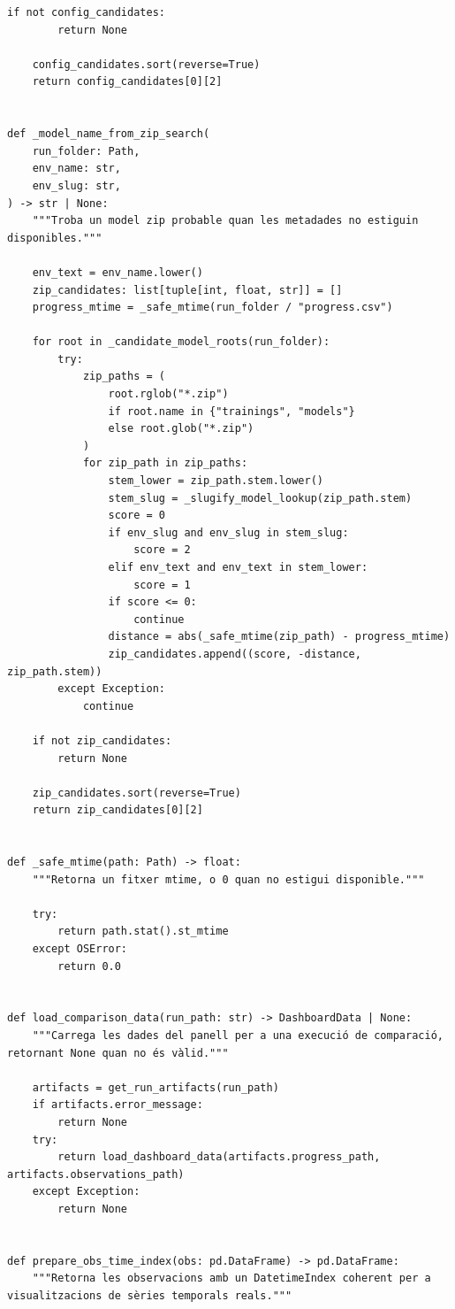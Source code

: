 \documentclass[10pt,a4paper]{article}
\begin{document}
\begin{lstlisting}[style=studioPython,caption={backend/resultats\_backend.py},label={lst:backend-resultats-backend-py}]
    if not config_candidates:
        return None

    config_candidates.sort(reverse=True)
    return config_candidates[0][2]


def _model_name_from_zip_search(
    run_folder: Path,
    env_name: str,
    env_slug: str,
) -> str | None:
    """Troba un model zip probable quan les metadades no estiguin disponibles."""

    env_text = env_name.lower()
    zip_candidates: list[tuple[int, float, str]] = []
    progress_mtime = _safe_mtime(run_folder / "progress.csv")

    for root in _candidate_model_roots(run_folder):
        try:
            zip_paths = (
                root.rglob("*.zip")
                if root.name in {"trainings", "models"}
                else root.glob("*.zip")
            )
            for zip_path in zip_paths:
                stem_lower = zip_path.stem.lower()
                stem_slug = _slugify_model_lookup(zip_path.stem)
                score = 0
                if env_slug and env_slug in stem_slug:
                    score = 2
                elif env_text and env_text in stem_lower:
                    score = 1
                if score <= 0:
                    continue
                distance = abs(_safe_mtime(zip_path) - progress_mtime)
                zip_candidates.append((score, -distance, zip_path.stem))
        except Exception:
            continue

    if not zip_candidates:
        return None

    zip_candidates.sort(reverse=True)
    return zip_candidates[0][2]


def _safe_mtime(path: Path) -> float:
    """Retorna un fitxer mtime, o 0 quan no estigui disponible."""

    try:
        return path.stat().st_mtime
    except OSError:
        return 0.0


def load_comparison_data(run_path: str) -> DashboardData | None:
    """Carrega les dades del panell per a una execució de comparació, retornant None quan no és vàlid."""

    artifacts = get_run_artifacts(run_path)
    if artifacts.error_message:
        return None
    try:
        return load_dashboard_data(artifacts.progress_path, artifacts.observations_path)
    except Exception:
        return None


def prepare_obs_time_index(obs: pd.DataFrame) -> pd.DataFrame:
    """Retorna les observacions amb un DatetimeIndex coherent per a visualitzacions de sèries temporals reals."""


\end{lstlisting}
\end{document}
